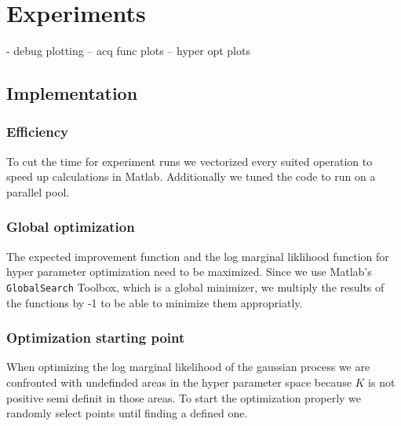 \chapter{Experiments}
\label{chap:4}

- debug plotting
-- acq func plots
-- hyper opt plots

\section{Implementation}

\subsection{Efficiency}
To cut the time for experiment runs we vectorized every suited operation to speed up calculations in Matlab. Additionally we tuned the code to run on a parallel pool.\\

\subsection{Global optimization}
The expected improvement function and the log marginal liklihood function for hyper parameter optimization need to be maximized. Since we use Matlab's \texttt{GlobalSearch} Toolbox, which is a global minimizer, we multiply the results of the functions by -1 to be able to minimize them appropriatly.
\\

\subsection{Optimization starting point}
When optimizing the log marginal likelihood of the gaussian process we are confronted with undefinded areas in the hyper parameter space because $K$ is not positive semi definit in those areas. To start the optimization properly we randomly select points until finding a defined one.

